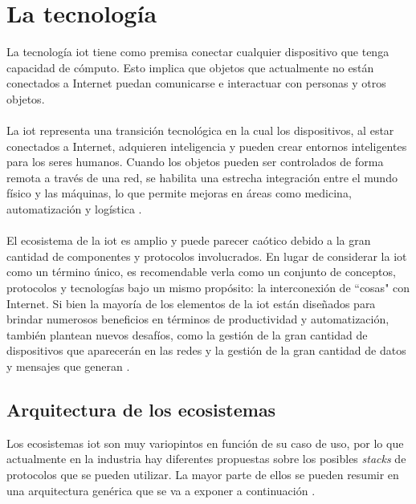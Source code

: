\section{La tecnología }
\label{iot}

La tecnología \gls{iot} tiene como premisa conectar cualquier dispositivo  que tenga capacidad de cómputo. Esto implica que objetos que actualmente no están conectados a Internet puedan comunicarse e interactuar con personas y otros objetos.\\
\\
La \gls{iot} representa una transición tecnológica en la cual los dispositivos, al estar conectados a Internet, adquieren inteligencia y pueden crear entornos inteligentes para los seres humanos. Cuando los objetos pueden ser controlados de forma remota a través de una red, se habilita una estrecha integración entre el mundo físico y las máquinas, lo que permite mejoras en áreas como medicina, automatización y logística \cite{7073822}.\\
\\
El ecosistema de la \gls{iot} es amplio y puede parecer caótico debido a la gran cantidad de componentes y protocolos involucrados. En lugar de considerar la \gls{iot} como un término único, es recomendable verla como un conjunto de conceptos, protocolos y tecnologías bajo un mismo propósito: la interconexión de ``cosas" con Internet. Si bien la mayoría de los elementos de la \gls{iot} están diseñados para brindar numerosos beneficios en términos de productividad y automatización, también plantean nuevos desafíos, como la gestión de la gran cantidad de dispositivos que aparecerán en las redes y la gestión de la gran cantidad de datos y mensajes que generan \cite{iotreview}.

\subsection{Arquitectura de los ecosistemas }


Los ecosistemas \gls{iot} son muy variopintos en función de su caso de uso, por lo que actualmente en la industria hay diferentes propuestas sobre los posibles \textit{stacks} de protocolos que se pueden utilizar. La mayor parte de ellos se pueden resumir en una arquitectura genérica que se va a exponer a continuación \cite{iotreview}.

